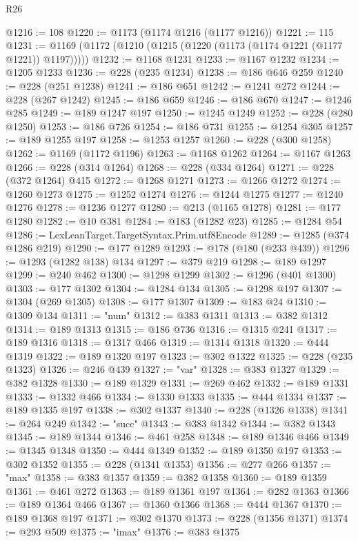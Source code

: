 \begin{lexlean}{R26}
\begin{coremodule}
@1216 := 108
@1220 := @1173 (@1174 @1216 (@1177 @1216))
@1221 := 115
@1231 := @1169 (@1172 (@1210 (@1215 (@1220 (@1173 (@1174 @1221 (@1177 @1221)) @1197)))))
@1232 := @1168 @1231
@1233 := @1167 @1232
@1234 := @1205 @1233
@1236 := @228 (@235 @1234)
@1238 := @186 @646 @259
@1240 := @228 (@251 @1238)
@1241 := @186 @651
@1242 := @1241 @272
@1244 := @228 (@267 @1242)
@1245 := @186 @659
@1246 := @186 @670
@1247 := @1246 @285
@1249 := @189 @1247 @197
@1250 := @1245 @1249
@1252 := @228 (@280 @1250)
@1253 := @186 @726
@1254 := @186 @731
@1255 := @1254 @305
@1257 := @189 @1255 @197
@1258 := @1253 @1257
@1260 := @228 (@300 @1258)
@1262 := @1169 (@1172 @1196)
@1263 := @1168 @1262
@1264 := @1167 @1263
@1266 := @228 (@314 @1264)
@1268 := @228 (@334 @1264)
@1271 := @228 (@372 @1264) @415
@1272 := @1268 @1271
@1273 := @1266 @1272
@1274 := @1260 @1273
@1275 := @1252 @1274
@1276 := @1244 @1275
@1277 := @1240 @1276
@1278 := @1236 @1277
@1280 := @213 (@1165 @1278)
@1281 := @177 @1280
@1282 := @10 @381
@1284 := @183 (@1282 @23)
@1285 := @1284 @54
@1286 := LexLeanTarget.TargetSyntax.Prim.utf8Encode
@1289 := @1285 (@374 @1286 @219)
@1290 := @177 @1289
@1293 := @178 (@180 (@233 @439))
@1296 := @1293 (@1282 @138) @134
@1297 := @379 @219
@1298 := @189 @1297
@1299 := @240 @462
@1300 := @1298 @1299
@1302 := @1296 (@401 @1300)
@1303 := @177 @1302
@1304 := @1284 @134
@1305 := @1298 @197
@1307 := @1304 (@269 @1305)
@1308 := @177 @1307
@1309 := @183 @24
@1310 := @1309 @134
@1311 := "num"
@1312 := @383 @1311
@1313 := @382 @1312
@1314 := @189 @1313
@1315 := @186 @736
@1316 := @1315 @241
@1317 := @189 @1316
@1318 := @1317 @466
@1319 := @1314 @1318
@1320 := @444 @1319
@1322 := @189 @1320 @197
@1323 := @302 @1322
@1325 := @228 (@235 @1323)
@1326 := @246 @439
@1327 := "var"
@1328 := @383 @1327
@1329 := @382 @1328
@1330 := @189 @1329
@1331 := @269 @462
@1332 := @189 @1331
@1333 := @1332 @466
@1334 := @1330 @1333
@1335 := @444 @1334
@1337 := @189 @1335 @197
@1338 := @302 @1337
@1340 := @228 (@1326 @1338)
@1341 := @264 @249
@1342 := "succ"
@1343 := @383 @1342
@1344 := @382 @1343
@1345 := @189 @1344
@1346 := @461 @258
@1348 := @189 @1346 @466
@1349 := @1345 @1348
@1350 := @444 @1349
@1352 := @189 @1350 @197
@1353 := @302 @1352
@1355 := @228 (@1341 @1353)
@1356 := @277 @266
@1357 := "max"
@1358 := @383 @1357
@1359 := @382 @1358
@1360 := @189 @1359
@1361 := @461 @272
@1363 := @189 @1361 @197
@1364 := @282 @1363
@1366 := @189 @1364 @466
@1367 := @1360 @1366
@1368 := @444 @1367
@1370 := @189 @1368 @197
@1371 := @302 @1370
@1373 := @228 (@1356 @1371)
@1374 := @293 @509
@1375 := "imax"
@1376 := @383 @1375

\end{coremodule}
\end{lexlean}
